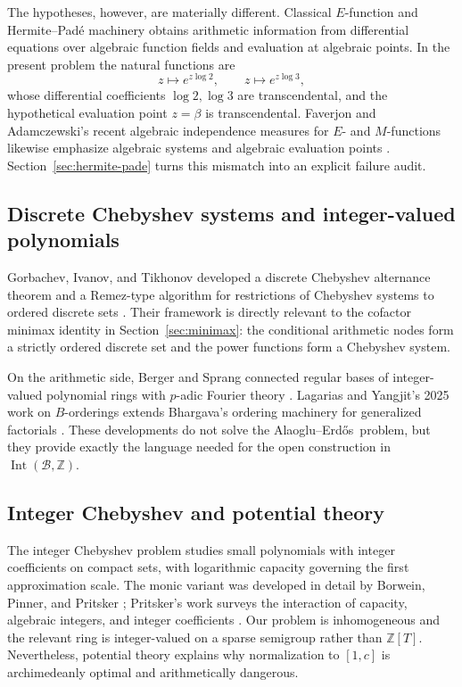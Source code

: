 \documentclass[11pt,oneside]{article}
\theoremstyle{definition}
\theoremstyle{remark}
\newcommand{\Z}{\mathbb Z}
\newcommand{\Bsem}{\mathcal B}
\newcommand{\Int}{\operatorname{Int}}
\newcommand{\AEname}{Alaoglu--Erd\H{o}s}
\begin{document}
The hypotheses, however, are materially different.  Classical $E$-function and
Hermite--Pad\'e machinery obtains arithmetic information from differential equations over
algebraic function fields and evaluation at algebraic points.  In the present problem the
natural functions are
\[
 z\longmapsto e^{z\log2},\qquad z\longmapsto e^{z\log3},
\]
whose differential coefficients $\log2,\log3$ are transcendental, and the hypothetical
evaluation point $z=\beta$ is transcendental.  Faverjon and Adamczewski's recent algebraic
independence measures for $E$- and $M$-functions likewise emphasize algebraic systems and
algebraic evaluation points \cite{AdamczewskiFaverjon2025}.  Section~\ref{sec:hermite-pade}
turns this mismatch into an explicit failure audit.

\subsection{Discrete Chebyshev systems and integer-valued polynomials}

Gorbachev, Ivanov, and Tikhonov developed a discrete Chebyshev alternance theorem and a
Remez-type algorithm for restrictions of Chebyshev systems to ordered discrete sets
\cite{GorbachevIvanovTikhonov2025}.  Their framework is directly relevant to the cofactor
minimax identity in Section~\ref{sec:minimax}: the conditional arithmetic nodes form a
strictly ordered discrete set and the power functions form a Chebyshev system.

On the arithmetic side, Berger and Sprang connected regular bases of integer-valued
polynomial rings with $p$-adic Fourier theory \cite{BergerSprang2025}.  Lagarias and Yangjit's 2025 work on $B$-orderings extends Bhargava's ordering machinery for generalized
factorials \cite{LagariasYangjit2025,Bhargava1997}.  These developments do not solve the
\AEname\ problem, but they provide exactly the language needed for the open construction in
$\Int(\Bsem,\Z)$.

\subsection{Integer Chebyshev and potential theory}

The integer Chebyshev problem studies small polynomials with integer coefficients on compact
sets, with logarithmic capacity governing the first approximation scale.  The monic variant
was developed in detail by Borwein, Pinner, and Pritsker
\cite{BorweinPinnerPritsker2003}; Pritsker's work surveys the interaction of capacity,
algebraic integers, and integer coefficients \cite{Pritsker2005}.  Our problem is
inhomogeneous and the relevant ring is integer-valued on a sparse semigroup rather than
$\Z[T]$.  Nevertheless, potential theory explains why normalization to $[1,c]$ is
archimedeanly optimal and arithmetically dangerous.
\end{document}
